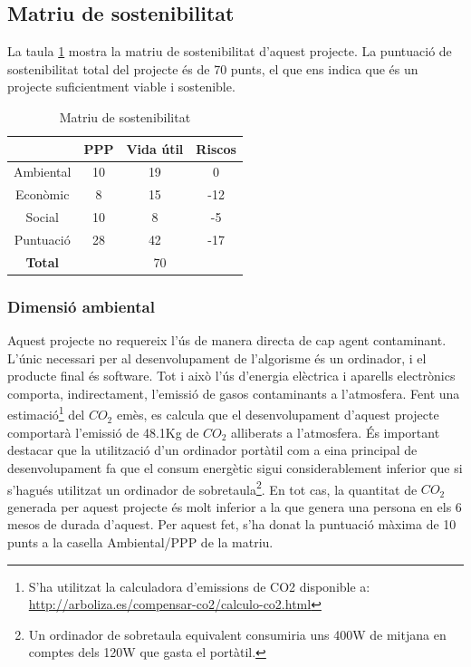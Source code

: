 \subsection{Matriu de sostenibilitat}
La taula \ref{tab:matriu_sostenibilitat} mostra la matriu de sostenibilitat d'aquest projecte. La puntuació de sostenibilitat total del projecte és de 70 punts, el que ens indica que és un projecte suficientment viable i sostenible.
\begin{table}[!htb]
    \centering
    \begin{tabular}{|c|c|c|c|}
    \hline
         & PPP & Vida útil & Riscos \\
         \hline\hline
        Ambiental & 10 & 19 & 0 \\
        \hline
        Econòmic & 8 & 15 & -12 \\
        \hline
        Social & 10 & 8 & -5 \\
        \hline\hline
        Puntuació & 28 & 42  & -17\\
        \hline
        \textbf{Total} & \multicolumn{3}{c|}{70} \\
        \hline
    \end{tabular}
    \caption{Matriu de sostenibilitat}
    \label{tab:matriu_sostenibilitat}
\end{table}

\subsubsection{Dimensió ambiental}

Aquest projecte no requereix l'ús de manera directa de cap agent contaminant. L'únic necessari per al desenvolupament de l'algorisme és un ordinador, i el producte final és software. Tot i això l'ús d'energia elèctrica i aparells electrònics comporta, indirectament, l'emissió de gasos contaminants a l'atmosfera. Fent una estimació\footnote{S'ha utilitzat la calculadora d'emissions de CO2 disponible a: \url{http://arboliza.es/compensar-co2/calculo-co2.html}} del $CO_2$ emès, es calcula que el desenvolupament d'aquest projecte comportarà l'emissió de 48.1Kg de $CO_2$ alliberats a l'atmosfera. És important destacar que la utilització d'un ordinador portàtil com a eina principal de desenvolupament fa que el consum energètic sigui considerablement inferior que si s'hagués utilitzat un ordinador de sobretaula\footnote{Un ordinador de sobretaula equivalent consumiria uns 400W de mitjana en comptes dels 120W que gasta el portàtil.}. En tot cas, la quantitat de $CO_2$ generada per aquest projecte és molt inferior a la que genera una persona en els 6 mesos de durada d'aquest. Per aquest fet, s'ha donat la puntuació màxima de 10 punts a la casella Ambiental/PPP de la matriu.

